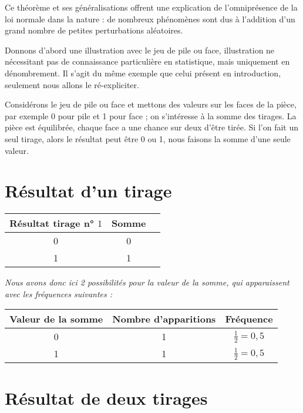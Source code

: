 \documentclass{article}
\begin{document}
\vspace{0.3cm}
\noindent
Ce théorème et ses généralisations offrent une explication de l'omniprésence de la loi normale dans la nature : de nombreux phénomènes sont dus à l'addition d'un grand nombre de petites perturbations aléatoires.

\vspace{0.3cm}
\noindent
Donnons d'abord une illustration avec le jeu de pile ou face, illustration ne nécessitant pas de connaissance particulière en statistique, mais uniquement en dénombrement. Il s'agit du même exemple que celui présent en introduction, seulement nous allons le ré-expliciter.

\vspace{0.3cm}
\noindent
Considérons le jeu de pile ou face et mettons des valeurs sur les faces de la pièce, par exemple 0 pour pile et 1 pour face ; on s'intéresse à la somme des tirages. La pièce est équilibrée, chaque face a une chance sur deux d'être tirée. Si l'on fait un seul tirage, alors le résultat peut être 0 ou 1, nous faisons la somme d'une seule valeur.



\section*{Résultat d'un tirage}

\begin{center}
\begin{tabular}{|c|c|c|}
\hline
Résultat tirage n° \( 1 \) & Somme \\ \hline
0 & 0 \\ \hline
1 & 1 \\ \hline
\end{tabular}
\end{center}

\textit{Nous avons donc ici 2 possibilités pour la valeur de la somme, qui apparaissent avec les fréquences suivantes :}

\begin{center}
\begin{tabular}{|c|c|c|}
\hline
Valeur de la somme & Nombre d'apparitions & Fréquence \\ \hline
0 & 1 & $\frac{1}{2} = 0,5$ \\ \hline
1 & 1 & $\frac{1}{2} = 0,5$ \\ \hline
\end{tabular}
\end{center}

\section*{Résultat de deux tirages}
\end{document}
